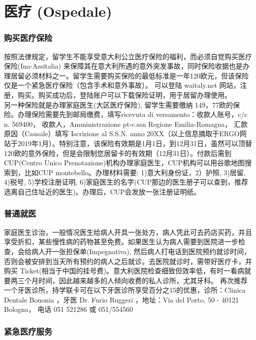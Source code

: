 \section{医疗 (Ospedale)}


\subsubsection{购买医疗保险}

按照法律规定，留学生不能享受意大利公立医疗保险的福利，而必须自觉购买医疗保险(Ina-Assitalia) 来保障其在意大利所遇的意外突发事故，同时保险收据也是办理居留必须材料之一。留学生需要购买保险的最低标准是一年120欧元，但该保险仅是一个紧急医疗保险（包含手术和意外事故）。
可以登陆 waitaly.net 网站，注册，购买。购买成功后，登陆账户可以下载保险证明，用于居留办理使用。\\
另一种保险就是办理家庭医生(大区医疗保险), 留学生需要缴纳 149，77欧的保险。办理保险需要先到邮局缴费，填写ricevuta di versamento：收款人账号，c/c n. 569400， 收款人，Amministrazione pt-c.ssn Regione Emilia-Romagna， 汇款原因（Causale）填写 Iscrizione al S.S.N. anno 20XX（以上信息摘取于ERGO网站于2019年1月）。特别注意，该保险有效期是1月1日，到12月31日，虽然可以顶替120欧的意外保险，但是会限制您居留卡的有效期（12月31日）。付款后需到CUP(Centro Unico Prenotazione)机构办理家庭医生，CUP机构可以用谷歌地图搜索到，比如CUP montebello。办理材料需要: 1)意大利身份证，2）护照, 3)居留, 4)税号, 5)学校注册证明, 6)家庭医生的名字(CUP那边的医生册子可以查到，推荐选离自己住址近的医生)。办理后，CUP会发放一张注册证明纸。

\subsubsection{普通就医}
家庭医生诊治，一般情况医生给病人开具一张处方，病人凭此可去药店买药，并且享受折扣，某些慢性病的药物甚至免费。如果医生认为病人需要到医院进一步检查，会给病人开一张担保单(Impegnativa), 然后病人打电话到医院预约就诊时间，否则会被安排到当天所有预约的病人之后就诊。去医院就诊时，需带好医疗卡，并购买 Ticket(相当于中国的挂号费)。意大利医院检查细致但效率低，有时一看病就要两三个月时间，因此越来越多的人倾向收费的私人诊所，尤其牙科。
再次推荐一个牙医诊所，持学联卡可在以下牙医诊所享受百分之15的优惠，诊所：Clinica Dentale Bononia ，牙医 Dr. Furio Ruggeri ，地址：Via del Porto, 50 - 40121 Bologna， 电话 051 521286 或 051/554560 

\subsubsection{紧急医疗服务}


